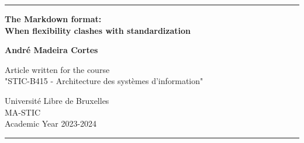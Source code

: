 \begin{titlepage}
	\center

	\rule{\linewidth}{1pt} %

	\vspace{2cm}

	\Large \textbf{
		The Markdown format: \\ \vspace{0.2cm} When flexibility clashes with standardization
	}

	\vspace{2cm}

	\large \textbf{ André Madeira Cortes }

	\vspace{12cm}

	Article written for the course \\ "STIC-B415 - Architecture des systèmes d'information" \\

	\vspace{0.8cm}

	Université Libre de Bruxelles\\
	MA-STIC \\
	Academic Year 2023-2024

	\rule{\linewidth}{1pt} %
\end{titlepage}